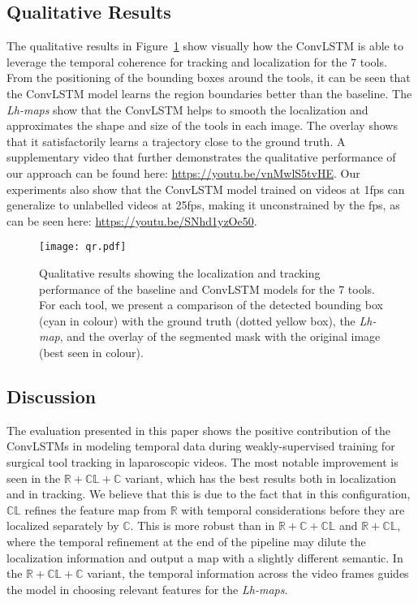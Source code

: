 \documentclass{svjour3}                     \smartqed
\begin{document}
\subsection{Qualitative Results}\label{sec:qualitative_results}
The qualitative results in Figure~\ref{fig:qualitative_results} show visually how the ConvLSTM is able to leverage the temporal coherence for tracking and localization for the 7 tools. 
From the positioning of the bounding boxes around the tools, it can be seen that the ConvLSTM model learns the region boundaries better than the baseline.
The \emph{Lh-maps} show that the ConvLSTM helps to smooth the localization and approximates the shape and size of the tools in each image. The overlay shows that it satisfactorily learns a trajectory close to the ground truth.
A supplementary video that further demonstrates the qualitative performance of our approach can be found here: \url{https://youtu.be/vnMwlS5tvHE}. 
Our experiments also show that the ConvLSTM model trained on videos at 1fps can generalize to unlabelled videos at 25fps, making it unconstrained by the fps, as can be seen here: \url{https://youtu.be/SNhd1yzOe50}.


\begin{figure}[t]\centering
        \texttt{[image: qr.pdf]}
        \caption{Qualitative results showing the localization and tracking performance of the baseline and ConvLSTM models for the 7 tools. For each tool, we present a comparison of the detected bounding box (cyan in colour) with the ground truth (dotted yellow box), the \emph{Lh-map}, and the overlay of the segmented mask with the original image (best seen in colour).}
        \label{fig:qualitative_results} 
\end{figure}

\subsection{Discussion}\label{sec:discussion}
The evaluation presented in this paper shows the positive contribution of the ConvLSTMs in modeling temporal data during weakly-supervised training for surgical tool tracking in laparoscopic videos. 
The most notable improvement is seen in the $\mathbb{R+CL+C}$ variant, which has the best results both in localization and in tracking.
We believe that this is due to the fact that in this configuration, $\mathbb{CL}$ refines the feature map from $\mathbb{R}$ with temporal considerations before they are localized separately by $\mathbb{C}$. This is more robust than in $\mathbb{R+C+CL}$ and $\mathbb{R+CL}$, where the temporal refinement at the end of the pipeline may dilute the localization information and output a map with a slightly different semantic. In the $\mathbb{R+CL+C}$ variant, the temporal information across the video frames guides the model in choosing relevant features for the \emph{Lh-maps}. 
\end{document}

